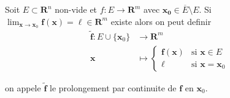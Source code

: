 Soit $E\subset \mathbf{R}^{n}$ non-vide et $f:E\to \mathbf{R}^{m}$ avec $\boldsymbol{x_{0}}\in \overline{E}\setminus E$. Si $\lim_{ \boldsymbol{x} \to \boldsymbol{x}_{0} }\boldsymbol{f}(\boldsymbol{x})=\boldsymbol{\ell}\in \mathbf{R}^{m}$ existe alors on peut definir 
\begin{align*}
\boldsymbol{\tilde{f}}:E\cup \{ \boldsymbol{x}_{0} \} & \to \mathbf{R}^{m} \\
\boldsymbol{x} & \mapsto \begin{cases}
\boldsymbol{f}(\boldsymbol{x}) & \text{si }\boldsymbol{x}\in E \\
\boldsymbol{\ell} & \text{si }\boldsymbol{x}=\boldsymbol{x}_{0}
\end{cases}
\end{align*}

on appele $\boldsymbol{\tilde{f}}$ le prolongement par continuite de $\boldsymbol{f}$ en $\boldsymbol{x}_{0}$.

